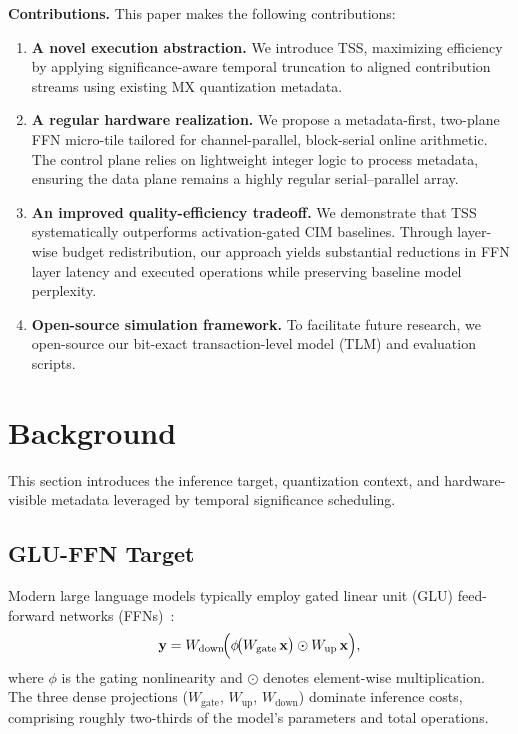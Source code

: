 \documentclass[sigconf]{acmart}
\begin{document}
\textbf{Contributions.}
This paper makes the following contributions:
\begin{enumerate}[nosep,leftmargin=1.2em]
  \item \textbf{A novel execution abstraction.} We introduce TSS, maximizing efficiency by applying significance-aware temporal truncation to aligned contribution streams using existing MX quantization metadata.
  \item \textbf{A regular hardware realization.} We propose a metadata-first, two-plane FFN micro-tile tailored for channel-parallel, block-serial online arithmetic. The control plane relies on lightweight integer logic to process metadata, ensuring the data plane remains a highly regular serial--parallel array.
  \item \textbf{An improved quality-efficiency tradeoff.} We demonstrate that TSS systematically outperforms activation-gated CIM baselines. Through layer-wise budget redistribution, our approach yields substantial reductions in FFN layer latency and executed operations while preserving baseline model perplexity.
  \item \textbf{Open-source simulation framework.} To facilitate future research, we open-source our bit-exact transaction-level model (TLM) and evaluation scripts.
\end{enumerate}



\section{Background}
\label{sec:background}

This section introduces the inference target, quantization context, and hardware-visible metadata leveraged by temporal significance scheduling.

\subsection{GLU-FFN Target}
\label{sec:bg:ffn}

Modern large language models typically employ gated linear unit (GLU) feed-forward networks (FFNs)~\cite{shazeer2020glu}:
\begin{equation}
  \mathbf{y}
  = W_{\mathrm{down}}\!\Bigl(
      \phi\!\bigl(W_{\mathrm{gate}}\,\mathbf{x}\bigr)
      \odot
      W_{\mathrm{up}}\,\mathbf{x}
    \Bigr),
  \label{eq:glu-ffn}
\end{equation}
where $\phi$ is the gating nonlinearity and $\odot$ denotes element-wise multiplication. The three dense projections ($W_{\mathrm{gate}}$, $W_{\mathrm{up}}$, $W_{\mathrm{down}}$) dominate inference costs, comprising roughly two-thirds of the model's parameters and total operations. 
\end{document}
